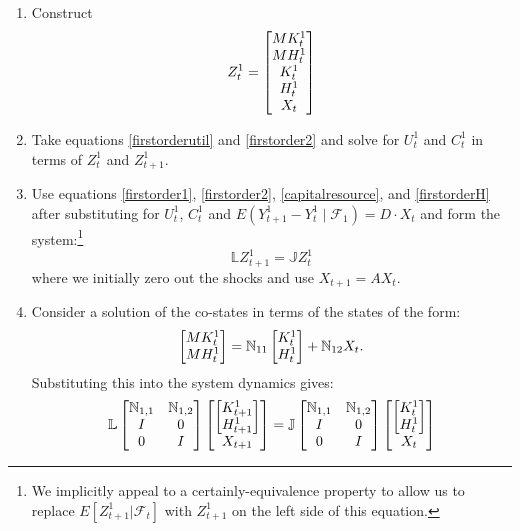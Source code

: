\documentclass[12pt]{article}
\begin{document}
\begin{enumerate}

\item Construct
\[
Z_t^1 = \begin{bmatrix} MK_t^1 \cr MH_t^1 \cr K_t^1 \cr H_t^1 \cr X_t \end{bmatrix}
\]

\item Take equations \eqref{firstorderutil} and \eqref{firstorder2} and solve for $U_t^1$ and $C_t^1$ in terms of $Z_t^1$ and $Z_{t+1}^1$.

\item Use equations \eqref{firstorder1}, \eqref{firstorder2}, \eqref{capitalresource}, and \eqref{firstorderH} after substituting for $U_t^1$, $C_t^1$ and $E\left(Y_{t+1}^1 - Y_{t}^1 \mid {\mathcal F}_1 \right) = D \cdot X_t$ and form the system:\footnote{We implicitly appeal to a certainly-equivalence
    property to allow us to replace $E [Z_{t+1}^1 | {\mathcal F}_t]$ with $Z_{t+1}^1$ on the left side of this equation.}
\[
{\mathbb L} Z_{t+1}^1 = {\mathbb J} Z_t^1
\]
where we initially zero out the shocks and use $X_{t+1} = A X_t$.

\item Consider a solution of the co-states in terms of the states of the form:
\[
 \begin{bmatrix} MK_t^1 \cr MH_t^1 \end{bmatrix} = {\mathbb N}_{11} \begin{bmatrix} K_{t}^1 \cr H_{t}^1 \end{bmatrix}
 + {\mathbb N}_{12} X_t.
\]
Substituting this into the system dynamics gives:
\[
{\mathbb L} \begin{bmatrix}  {\mathbb N}_{1,1} & {\mathbb N}_{1,2} \cr I  & 0 \cr 0 & I  \end{bmatrix} \begin{bmatrix} \begin{bmatrix} K_{t+1}^1 \cr H_{t+1}^1 \end{bmatrix} \cr X_{t+1} \end{bmatrix}  = {\mathbb J} \begin{bmatrix}  {\mathbb N}_{1,1} & {\mathbb N}_{1,2} \cr I  & 0 \cr 0 & I  \end{bmatrix} \begin{bmatrix} \begin{bmatrix} K_{t}^1 \cr H_{t}^1 \end{bmatrix} \cr X_t \end{bmatrix}
\]


\end{enumerate}
\end{document}
